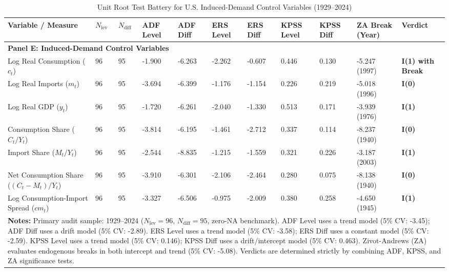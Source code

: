 \documentclass[11pt,a4paper]{article}
\begin{document}
\begin{landscape}
\begin{table}[h!]
\centering
\footnotesize
\caption{Unit Root Test Battery for U.S. Induced-Demand Control Variables (1929--2024)}
\label{tab:urca_results_demand}
\begin{tabular}{p{6.0cm} p{0.6cm} p{0.6cm} p{1.5cm} p{1.5cm} p{1.5cm} p{1.5cm} p{1.5cm} p{1.5cm} p{2.2cm} p{2.2cm}}
\toprule
\textbf{Variable / Measure} & \textbf{$N_{\text{lev}}$} & \textbf{$N_{\text{diff}}$} & \textbf{ADF Level} & \textbf{ADF Diff} & \textbf{ERS Level} & \textbf{ERS Diff} & \textbf{KPSS Level} & \textbf{KPSS Diff} & \textbf{ZA Break (Year)} & \textbf{Verdict} \\
\midrule
\multicolumn{11}{l}{\textbf{Panel E: Induced-Demand Control Variables}} \\
\midrule
Log Real Consumption ($c_t$) & 96 & 95 & -1.900 & -6.263 & -2.262 & -0.607 & 0.446 & 0.130 & -5.247 (1997) & \textbf{I(1) with Break} \\
Log Real Imports ($m_t$) & 96 & 95 & -3.694 & -6.399 & -1.176 & -1.154 & 0.226 & 0.219 & -5.018 (1996) & \textbf{I(0)} \\
Log Real GDP ($y_t$) & 96 & 95 & -1.720 & -6.261 & -2.040 & -1.330 & 0.513 & 0.171 & -3.939 (1976) & \textbf{I(1)} \\
Consumption Share ($C_t/Y_t$) & 96 & 95 & -3.814 & -6.195 & -1.461 & -2.712 & 0.337 & 0.114 & -8.237 (1940) & \textbf{I(0)} \\
Import Share ($M_t/Y_t$) & 96 & 95 & -2.544 & -8.835 & -1.215 & -1.559 & 0.321 & 0.226 & -3.187 (2003) & \textbf{I(1)} \\
Net Consumption Share ($(C_t - M_t)/Y_t$) & 96 & 95 & -3.910 & -6.301 & -2.106 & -2.464 & 0.280 & 0.075 & -8.138 (1940) & \textbf{I(0)} \\
Log Consumption-Import Spread ($cm_t$) & 96 & 95 & -3.327 & -6.506 & -0.975 & -2.009 & 0.380 & 0.258 & -4.650 (1945) & \textbf{I(1)} \\
\bottomrule
\multicolumn{11}{p{23.0cm}}{\footnotesize \textbf{Notes:} Primary audit sample: 1929--2024 ($N_{\text{lev}}=96$, $N_{\text{diff}}=95$, zero-NA benchmark). ADF Level uses a trend model (5\% CV: -3.45); ADF Diff uses a drift model (5\% CV: -2.89). ERS Level uses a trend model (5\% CV: -3.58); ERS Diff uses a constant model (5\% CV: -2.59). KPSS Level uses a trend model (5\% CV: 0.146); KPSS Diff uses a drift/intercept model (5\% CV: 0.463). Zivot-Andrews (ZA) evaluates endogenous breaks in both intercept and trend (5\% CV: -5.08). Verdicts are determined strictly by combining ADF, KPSS, and ZA significance tests.}
\end{tabular}
\end{table}
\end{landscape}
\end{document}
